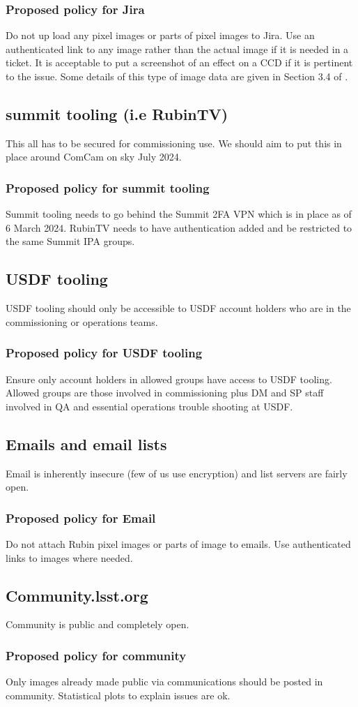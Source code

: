 \subsubsection{Proposed policy for Jira}
Do not up load any pixel images or parts of pixel images to Jira.
Use an authenticated link to any image rather than the actual image if it is needed in a ticket.
It is acceptable to put a screenshot of an effect on a CCD if it is pertinent to the issue.
Some details of this type of image data are given in Section 3.4 of .

\subsection{summit tooling (i.e RubinTV)}
This all has to be secured for commissioning use.
We should aim to put this in place around ComCam on sky July 2024.

\subsubsection{Proposed policy for summit tooling}
Summit tooling needs to go behind the Summit 2FA VPN which is in place as of 6 March 2024.
RubinTV needs to have authentication added and be restricted to the same Summit IPA groups.

\subsection{USDF tooling}
USDF tooling should only be accessible to USDF account holders who are in the commissioning or operations teams.
\subsubsection{Proposed policy for USDF tooling}
Ensure only account holders in allowed groups have access to USDF tooling.
Allowed groups are those involved in commissioning plus DM and SP staff involved in QA and essential operations trouble shooting at USDF.

\subsection{Emails and email  lists }
Email is inherently insecure (few of us use encryption) and list servers are fairly open.

\subsubsection{Proposed policy for Email}
Do not attach Rubin pixel images or parts of image to emails.
Use authenticated links to images where needed.


\subsection{ Community.lsst.org}
Community is public and completely open.
\subsubsection{Proposed policy for community}
Only images already made public via communications should be posted in community.
Statistical plots to explain issues are ok.
